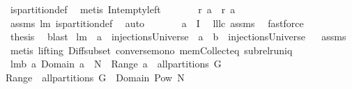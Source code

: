 \begin{isabellebody}
\ is{\isacharunderscore}partition{\isacharunderscore}def\ \isamarkupfalse%
\ {\isacharparenleft}metis\ Int{\isacharunderscore}empty{\isacharunderscore}left{\isacharparenright}\isanewline
\ \ \isamarkupfalse%
\ \isamarkupfalse%
\ \isamarkupfalse%
\ {\isachardoublequoteopen}{\isacharquery}r\ a{}\ {\isasyminter}\ {\isacharparenleft}{\isacharquery}r\ a{}{\isacharparenright}\ {\isacharequal}\ {\isacharbraceleft}{\isacharbraceright}{\isachardoublequoteclose}\ \isamarkupfalse%
\ assms\ lm{}{}\ is{\isacharunderscore}partition{\isacharunderscore}def\ \isamarkupfalse%
\ auto\isanewline
\ \ \isamarkupfalse%
\ \isamarkupfalse%
\ \isamarkupfalse%
\ {\isachardoublequoteopen}{\isacharquery}a\ {\isasymin}\ {\isacharquery}I{\isachardoublequoteclose}\ \isamarkupfalse%
\ lll{}{}c\ assms\ \isamarkupfalse%
\ fastforce\isanewline
\ \ \isamarkupfalse%
\ \isamarkupfalse%
\ {\isacharquery}thesis\ \isamarkupfalse%
\ blast\isanewline
{}\isamarkupfalse%
%
\endisatagproof
{\isafoldproof}%
%
\isadelimproof
\isanewline
%
\endisadelimproof
\isanewline
{}\isamarkupfalse%
\ lm{}{}{\isacharcolon}\ \ {\isachardoublequoteopen}a\ {\isasymin}\ injectionsUniverse{\isachardoublequoteclose}\ \ {\isachardoublequoteopen}a\ {\isacharminus}\ b\ {\isasymin}\ injectionsUniverse{\isachardoublequoteclose}%
\isadelimproof
\ %
\endisadelimproof
%
\isatagproof
{}\isamarkupfalse%
\ assms\ \isanewline
{}\isamarkupfalse%
\ {\isacharparenleft}metis\ {\isacharparenleft}lifting{\isacharparenright}\ Diff{\isacharunderscore}subset\ converse{\isacharunderscore}mono\ mem{\isacharunderscore}Collect{\isacharunderscore}eq\ subrel{\isacharunderscore}runiq{\isacharparenright}%
\endisatagproof
{\isafoldproof}%
%
\isadelimproof
%
\endisadelimproof
\isanewline
\isanewline
{}\isamarkupfalse%
\ lm{}{}b{\isacharcolon}\ {\isachardoublequoteopen}{\isacharbraceleft}a{\isachardot}\ Domain\ a\ {\isasymsubseteq}\ N\ {\isacharampersand}\ Range\ a\ {\isasymin}\ all{\isacharunderscore}partitions\ G{\isacharbraceright}\ {\isacharequal}\isanewline
{\isacharparenleft}Range\ {\isacharminus}{\isacharbackquote}\ {\isacharparenleft}all{\isacharunderscore}partitions\ G{\isacharparenright}{\isacharparenright}\ {\isasyminter}\ {\isacharparenleft}Domain\ {\isacharminus}{\isacharbackquote}{\isacharparenleft}Pow\ N{\isacharparenright}{\isacharparenright}{\isachardoublequoteclose}\ \isanewline

\end{isabellebody}
